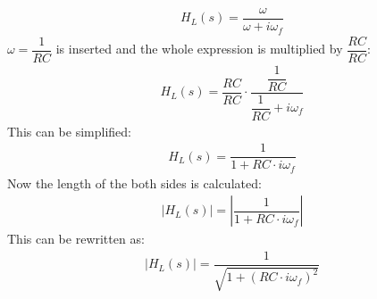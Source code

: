 \begin{align}
H_{L}(s) = \dfrac{\omega}{\omega+i \omega_f} 
\end{align}
$\omega = \dfrac{1}{RC}$ is inserted and the whole expression is multiplied by $\dfrac{RC}{RC}$:
\begin{align}
H_{L}(s) = \dfrac{RC}{RC} \cdot \dfrac{\dfrac{1}{RC}}{\dfrac{1}{RC}+i \omega_f} 
\end{align}
This can be simplified:
\begin{align}
H_{L}(s) =  \dfrac{1}{1+RC \cdot i \omega_f} 
\end{align}
Now the length of the both sides is calculated:
\begin{align}
\left|H_{L}(s) \right| =  \left|\dfrac{1}{1+RC \cdot i \omega_f} \right| 
\end{align}
This can be rewritten as:
\begin{align}
\left|H_{L}(s) \right| =  \dfrac{1}{\sqrt{1+(RC \cdot i \omega_f)^2}}
\end{align}
